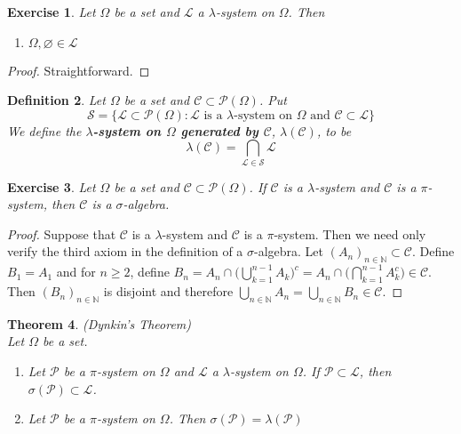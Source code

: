 \documentclass[12pt]{amsart}
\newtheorem{thm}{Theorem}[subsection]
\newtheorem{defn}[thm]{Definition}
\newtheorem{ex}[thm]{Exercise}
\newcommand{\lam}{\lambda}
\newcommand{\sig}{\sigma}
\newcommand{\Om}{\Omega}
\newcommand{\N}{\mathbb{N}}
\newcommand{\MC}{\mathcal{C}}
\newcommand{\ML}{\mathcal{L}}
\newcommand{\MS}{\mathcal{S}}
\newcommand{\MP}{\mathcal{P}}
\begin{document}
	\begin{ex}
		Let $\Om$ be a set and $\ML$ a $\lam$-system on $\Om$. Then 
		\begin{enumerate}
			\item $\Om, \varnothing \in \ML$
		\end{enumerate} 
	\end{ex}
	
	\begin{proof}
		Straightforward.
	\end{proof}
	
	\begin{defn}
		Let $\Om$ be a set and $\MC \subset \MP(\Om)$. Put $$\MS = \{\ML \subset \MP(\Om): \ML \text{ is a }\lam\text{-system on }\Om \text{ and } \MC \subset \ML\}$$ We define the \textbf{$\lam$-system on $\Om$ generated by $\MC$}, $\lam(\MC)$, to be $$\lam(\MC) = \bigcap_{\ML \in \MS}\ML$$
	\end{defn}
	
	\begin{ex}
		Let $\Om$ be a set and $\MC \subset \MP(\Om)$. If $\MC$ is a $\lam$-system and $\MC$ is a $\pi$-system, then $\MC$ is a $\sig$-algebra.
	\end{ex}
	
	\begin{proof}
		Suppose that $\MC$ is a $\lam$-system and $\MC$ is a $\pi$-system. Then we need only verify the third axiom in the definition of a $\sig$-algebra. Let $(A_n)_{n \in \N} \subset \MC$. Define $B_1 = A_1$ and for $n \geq 2$, define $B_n = A_n \cap \bigg( \bigcup\limits_{k=1}^{n-1}A_k \bigg)^c = A_n \cap \bigg( \bigcap\limits_{k=1}^{n-1}A_k^c \bigg) \in \MC$. Then $(B_n)_{n \in \N}$ is disjoint and therefore $\bigcup\limits_{n \in \N}A_n = \bigcup\limits_{n \in \N}B_n \in \MC$.
	\end{proof}
	
	\begin{thm}(Dynkin's Theorem) \\
		Let $\Om$ be a set.
		\begin{enumerate}
			\item Let $\MP$ be a $\pi$-system on $\Om$ and $\ML$ a $\lam$-system on $\Om$. If $\MP \subset \ML$, then $\sig(\MP) \subset \ML$.
			\item Let $\MP$ be a $\pi$-system on $\Om$. Then $\sig(\MP) = \lam(\MP)$
		\end{enumerate} 
		
	\end{thm}
	
\end{document}

